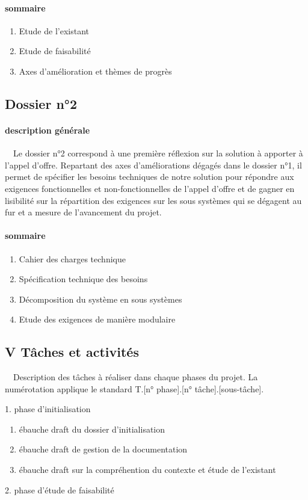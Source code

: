 \documentclass{article}
\begin{document}
\paragraph[sommaire]{sommaire}
\begin{enumerate}
\item Etude de l’existant
\item Etude de faisabilité
\item Axes d’amélioration et thèmes de progrès
\end{enumerate}
\subsection[Dossier n°2]{Dossier n°2}
\paragraph[description générale]{description générale}
\ \ Le dossier n°2 correspond à une première réflexion sur la solution à
apporter à l’appel d’offre. Repartant des axes d’améliorations dégagés
dans le dossier n°1, il permet de spécifier les besoins techniques de
notre solution pour répondre aux exigences fonctionnelles et
non-fonctionnelles  de l’appel d’offre et de gagner en lisibilité sur
la répartition des exigences sur les sous systèmes qui se dégagent au
fur et a mesure de l’avancement du projet.

\paragraph[sommaire]{sommaire}
\begin{enumerate}
\item Cahier des charges technique
\item Spécification technique des besoins
\item Décomposition du système en sous systèmes
\item Etude des exigences de manière modulaire
\end{enumerate}
\subsection[V Tâches et activités]{V Tâches et activités}
\ \ Description des tâches à réaliser dans chaque phases du projet. La
numérotation applique le standard T.[n° phase].[n° tâche].[sous-tâche].

1. phase d’initialisation

\begin{enumerate}
\item ébauche draft du dossier d’initialisation
\item ébauche draft de gestion de la documentation
\item ébauche draft sur la compréhention du contexte et étude de
l’existant
\end{enumerate}
2. phase d’étude de faisabilité
\end{document}
